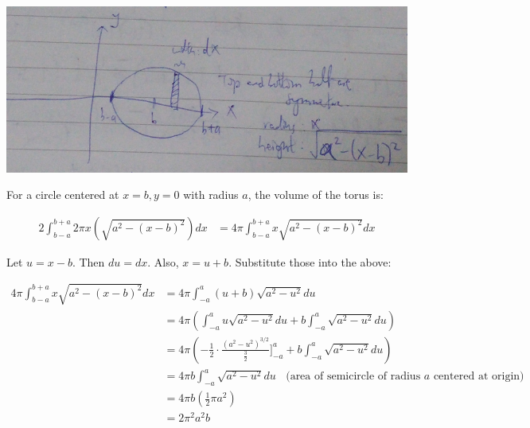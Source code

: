 \documentclass[9pt]{article}
\begin{document}
\begin{center}
  \includegraphics[scale=0.5]{q2.jpg}
\end{center}

For a circle centered at $x = b, y = 0$ with radius $a$, the volume of the torus is:

\begin{align*}
  2 \int_{b-a}^{b+a} 2 \pi x (\sqrt{a^2 - (x - b)^2}) dx &= 4 \pi \int_{b-a}^{b+a} x \sqrt{a^2 - (x - b)^2} dx
\end{align*}

Let $u = x - b$. Then $du = dx$. Also, $x = u + b$. Substitute those into the above:

\begin{align*}
  4 \pi \int_{b-a}^{b+a} x \sqrt{a^2 - (x - b)^2} dx &= 4 \pi \int_{-a}^{a} (u + b) \sqrt{a^2 - u^2} du \\
  &= 4 \pi (\int_{-a}^{a} u \sqrt{a^2 - u^2} du + b \int_{-a}^{a} \sqrt{a^2 - u^2} du) \\
  &= 4\pi ( -\frac{1}{2} \cdot \frac{({a^2 - u^2})^{3/2}}{\frac{3}{2}} \bigg]_{-a}^{a} + b \int_{-a}^{a} \sqrt{a^2 - u^2} du ) \\
  &= 4 \pi b \int_{-a}^{a} \sqrt{a^2 - u^2} du \ \ \ \ \text{(area of semicircle of radius $a$ centered at origin)} \\
  &= 4 \pi b (\frac{1}{2} \pi a^2) \\
  &= 2 \pi^2 a^2 b
\end{align*}
\end{document}
